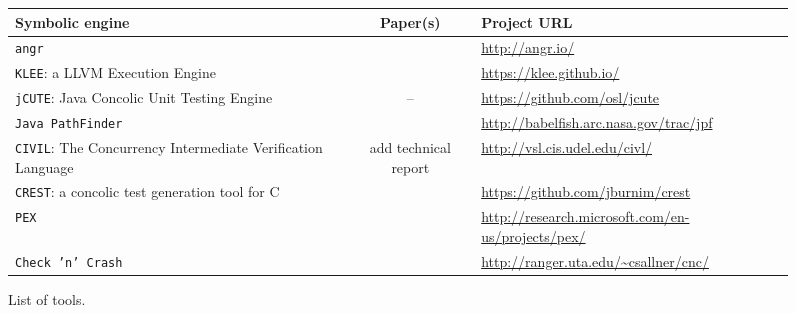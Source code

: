 \begin{figure}[t]
  \centering
  \begin{adjustbox}{width=1\columnwidth}
  \begin{small}
  \begin{tabular}{| l || c || l |}
    \hline      
    Symbolic engine & Paper(s) & Project URL  \\ \hline\hline
    {\tt angr} & \cite{FIRMALICE-NDSS15} & \url{http://angr.io/} \\
    {\tt KLEE}: a LLVM Execution Engine & \cite{KLEE-OSDI08} & \url{https://klee.github.io/} \\
    {\tt jCUTE}: Java Concolic Unit Testing Engine & -- & \url{https://github.com/osl/jcute} \\
    {\tt Java PathFinder} & \cite{PATHFINDER-ASE10} & \url{http://babelfish.arc.nasa.gov/trac/jpf}\\
    {\tt CIVIL}: The Concurrency Intermediate Verification Language & add technical report & \url{http://vsl.cis.udel.edu/civl/}\\
    {\tt CREST}: a concolic test generation tool for C & \cite{CREST-ASE08} & \url{https://github.com/jburnim/crest} \\
    {\tt PEX} & \cite{PEX-TAP08} & \url{http://research.microsoft.com/en-us/projects/pex/} \\
    {\tt Check 'n' Crash} & \cite{CS-ICSE05} & \url{http://ranger.uta.edu/~csallner/cnc/}\\
    \hline  
  \end{tabular}
  \end{small}
  \end{adjustbox}
  \caption{List of tools.}
  \label{tab:symbolic-engines}
\end{figure}